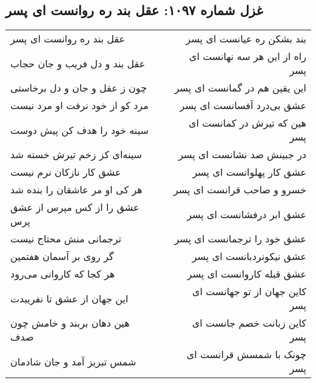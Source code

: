 \begin{center}
\section*{غزل شماره ۱۰۹۷: عقل بند ره روانست ای پسر}
\label{sec:1097}
\begin{longtable}{l p{0.5cm} r}
عقل بند ره روانست ای پسر
&&
بند بشکن ره عیانست ای پسر
\\
عقل بند و دل فریب و جان حجاب
&&
راه از این هر سه نهانست ای پسر
\\
چون ز عقل و جان و دل برخاستی
&&
این یقین هم در گمانست ای پسر
\\
مرد کو از خود نرفت او مرد نیست
&&
عشق بی‌درد آفسانست ای پسر
\\
سینه خود را هدف کن پیش دوست
&&
هین که تیرش در کمانست ای پسر
\\
سینه‌ای کز زخم تیرش خسته شد
&&
در جبینش صد نشانست ای پسر
\\
عشق کار نازکان نرم نیست
&&
عشق کار پهلوانست ای پسر
\\
هر کی او مر عاشقان را بنده شد
&&
خسرو و صاحب قرانست ای پسر
\\
عشق را از کس مپرس از عشق پرس
&&
عشق ابر درفشانست ای پسر
\\
ترجمانی منش محتاج نیست
&&
عشق خود را ترجمانست ای پسر
\\
گر روی بر آسمان هفتمین
&&
عشق نیکونردبانست ای پسر
\\
هر کجا که کاروانی می‌رود
&&
عشق قبله کاروانست ای پسر
\\
این جهان از عشق تا نفریبدت
&&
کاین جهان از تو جهانست ای پسر
\\
هین دهان بربند و خامش چون صدف
&&
کاین زبانت خصم جانست ای پسر
\\
شمس تبریز آمد و جان شادمان
&&
چونک با شمسش قرانست ای پسر
\\
\end{longtable}
\end{center}
